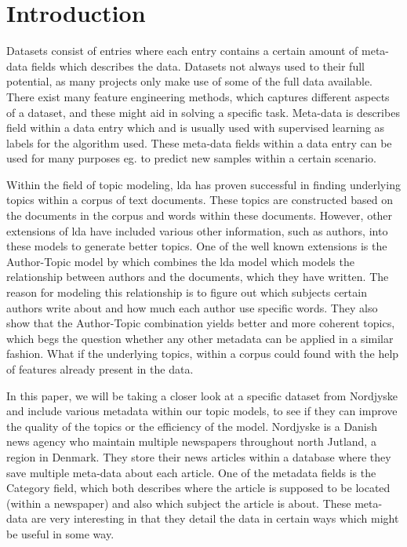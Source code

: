\section{Introduction}\label{sec:introduction}
Datasets consist of entries where each entry contains a certain amount of meta-data fields which describes the data.
Datasets not always used to their full potential, as many projects only make use of some of the full data available.
There exist many feature engineering methods, which captures different aspects of a dataset, and these might aid in solving a specific task.
Meta-data is describes field within a data entry which and is usually used with supervised learning as labels for the algorithm used.
These meta-data fields within a data entry can be used for many purposes eg. to predict new samples within a certain scenario.

Within the field of topic modeling, \Gls{lda} has proven successful in finding underlying topics within a corpus of text documents.
These topics are constructed based on the documents in the corpus and words within these documents. 
However, other extensions of \gls{lda} have included various other information, such as authors, into these models to generate better topics.
One of the well known extensions is the Author-Topic model by \citet{author_topic} which combines the \gls{lda} model which models the relationship between authors and the documents, which they have written.
The reason for modeling this relationship is to figure out which subjects certain authors write about and how much each author use specific words. 
They also show that the Author-Topic combination yields better and more coherent topics, which begs the question whether any other metadata can be applied in a similar fashion.
What if the underlying topics, within a corpus could found with the help of features already present in the data.

In this paper, we will be taking a closer look at a specific dataset from Nordjyske and include various metadata within our topic models, to see if they can improve the quality of the topics or the efficiency of the model.
Nordjyske is a Danish news agency who maintain multiple newspapers throughout north Jutland, a region in Denmark.
They store their news articles within a database where they save multiple meta-data about each article.
One of the metadata fields is the Category field, which both describes where the article is supposed to be located (within a newspaper) and also which subject the article is about.
These meta-data are very interesting in that they detail the data in certain ways which might be useful in some way.

